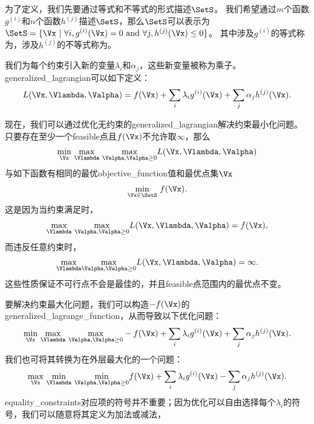 为了定义，我们先要通过等式和不等式的形式描述$\SetS$。 
我们希望通过$m$个函数$g^{(i)}$和$n$个函数$h^{(j)}$描述$\SetS$，那么$\SetS$可以表示为$\SetS = \{ \Vx ~|~ \forall i, g^{(i)}(\Vx) = 0 ~\text{and}~ \forall j, h^{(j)}(\Vx) \leq 0  \}$。
其中涉及$g^{(i)}$的等式称为，涉及$h^{(j)}$的不等式称为。

我们为每个约束引入新的变量$\lambda_i$和$\alpha_j$，这些新变量被称为乘子。\gls{generalized_lagrangian}可以如下定义：
\begin{align}
 L(\Vx, \Vlambda, \Valpha) = f(\Vx) + \sum_i \lambda_i g^{(i)}(\Vx)  + \sum_j \alpha_j h^{(j)}(\Vx).
\end{align}

现在，我们可以通过优化无约束的\gls{generalized_lagrangian}解决约束最小化问题。
只要存在至少一个\gls{feasible}点且$f(\Vx)$不允许取$\infty$，那么
\begin{align}
 \underset{\Vx}{\min}~  \underset{\Vlambda}{\max}~
 \underset{\Valpha, \Valpha \geq 0}{\max}   L(\Vx, \Vlambda, \Valpha) 
\end{align}
与如下函数有相同的最优\gls{objective_function}值和最优点集$\Vx$
\begin{align}
 \underset{\Vx \in \SetS}{\min}~ f(\Vx).
\end{align}
这是因为当约束满足时，
\begin{align}
  \underset{\Vlambda}{\max}~
 \underset{\Valpha, \Valpha \geq 0}{\max}   L(\Vx, \Vlambda, \Valpha)  = f(\Vx) ,
\end{align}
而违反任意约束时，
\begin{align}
  \underset{\Vlambda}{\max}  
 \underset{\Valpha, \Valpha \geq 0}{\max}   L(\Vx, \Vlambda, \Valpha)  = \infty .
\end{align}
这些性质保证不可行点不会是最佳的，并且\gls{feasible}点范围内的最优点不变。


要解决约束最大化问题，我们可以构造$-f(\Vx)$的\gls{generalized_lagrange_function}，从而导致以下优化问题：
\begin{align}
 \underset{\Vx}{\min}~ \underset{\Vlambda}{\max}  ~
 \underset{\Valpha, \Valpha \geq 0}{\max} 
  -f(\Vx) + \sum_i \lambda_i g^{(i)}(\Vx)  + \sum_j \alpha_j h^{(j)}(\Vx).
\end{align}
我们也可将其转换为在外层最大化的一个问题：
\begin{align}
 \underset{\Vx}{\max}~ \underset{\Vlambda}{\min}~
 \underset{\Valpha, \Valpha \geq 0}{\min} 
  f(\Vx) + \sum_i \lambda_i g^{(i)}(\Vx) - \sum_j \alpha_j h^{(j)}(\Vx).
\end{align}
\gls{equality_constraints}对应项的符号并不重要；因为优化可以自由选择每个$\lambda_i$的符号，我们可以随意将其定义为加法或减法，


